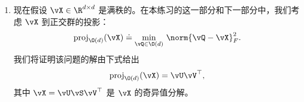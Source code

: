 \documentclass[../../book-main_zh.tex]{subfiles}
\begin{document}
\begin{exercise}
\begin{enumerate}
            $\mathrm{grad}\, f(\vQ)$ 关于 $\vQ$ 求导，证明\textit{黎曼海森矩阵}由下式给出
            \begin{equation}\label{eq:exercise-riemann-hess-orthogonal-group}
                \mathrm{Hess}\, f(\vQ) = \cP_{T_{\vQ}\O(d)} \left(
                    \nabla^2 f(\vQ) - \Symm(\vQ^\top \nabla f(\vQ)) \kron \vI
                \right) \cP_{T_{\vQ}\O(d)},
            \end{equation}
            其中 $\Symm(\vDelta) = \tfrac{1}{2}(\vDelta +
            \vDelta^\top)$ 表示到对称矩阵集合的正交投影，$\kron$ 表示矩阵的克罗内克积（Kronecker product）。
            请注意，将前一个表达式中出现的算子解释为\textit{在 ${d \times d}$
            矩阵上的线性变换}，而\textbf{不是} $d \times d$ 矩阵本身。
            优化问题
            \eqref{eq:exercise-orthogonal-group-constrained-max}
            的\textit{二阶最优性条件}可以用黎曼海森矩阵表示：
            \begin{equation*}
                \mathrm{Hess}\, f(\vQ) \preceq \mathbf{0}.
            \end{equation*}
            对于最小化问题，符号反转。

            \textit{（提示：关键是操作计算以获得尽可能紧凑的形式
                \eqref{eq:exercise-riemann-hess-orthogonal-group}。为此，利用克罗内克积的以下同构：如果
                $\vA$、$\vX$ 和 $\vB$ 是兼容尺寸的矩阵，那么有
                \begin{equation*}
                    (\vB^\top \kron \vA) \Vec(\vX) = \Vec(\vA \vX \vB),
                \end{equation*}
                其中 $\Vec(\vX)$ 表示将矩阵参数的列“从左到右”堆叠成一个向量。我们在
                \eqref{eq:exercise-riemann-hess-orthogonal-group}
            中使用这种同构，以便以规范的方式将两个矩阵的克罗内克积定义为矩阵上的算子。）}

        \item 现在假设 $\vX \in \R^{d\times d}$ 是满秩的。在本练习的这一部分和下一部分中，我们考虑
            $\vX$ 到正交群的投影：
            \begin{equation}\label{eq:projection-onto-ogrp-defn}
                \mathrm{proj}_{\O(d)}(\vX) \doteq
                \min_{\vQ \in \O(d)
                }\, \norm{\vQ - \vX}_F^2.
            \end{equation}
            我们将证明该问题的解由下式给出
            \begin{equation*}
                \mathrm{proj}_{\O(d)}(\vX)
                =
                \vU \vV^\top,
            \end{equation*}
            其中 $\vX = \vU \vS \vV^\top$ 是 $\vX$ 的奇异值分解。


\end{enumerate}
\end{exercise}
\end{document}

